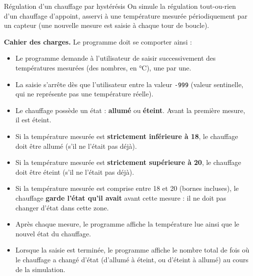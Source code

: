 \begin{UPSTIexercice}{Régulation d'un chauffage par hystérésis}
    On simule la régulation tout-ou-rien d'un chauffage d'appoint, asservi à une température mesurée périodiquement par un capteur (une nouvelle mesure est saisie à chaque tour de boucle).

    \textbf{Cahier des charges.} Le programme doit se comporter ainsi :
    \begin{itemize}
        \item Le programme demande à l'utilisateur de saisir successivement des températures mesurées (des nombres, en °C), une par une.
        \item La saisie s'arrête dès que l'utilisateur entre la valeur \texttt{-999} (valeur sentinelle, qui ne représente pas une température réelle).
        \item Le chauffage possède un état : \textbf{allumé} ou \textbf{éteint}. Avant la première mesure, il est éteint.
        \item Si la température mesurée est \textbf{strictement inférieure à 18}, le chauffage doit être allumé (s'il ne l'était pas déjà).
        \item Si la température mesurée est \textbf{strictement supérieure à 20}, le chauffage doit être éteint (s'il ne l'était pas déjà).
        \item Si la température mesurée est comprise entre 18 et 20 (bornes incluses), le chauffage \textbf{garde l'état qu'il avait} avant cette mesure : il ne doit pas changer d'état dans cette zone.
        \item Après chaque mesure, le programme affiche la température lue ainsi que le nouvel état du chauffage.
        \item Lorsque la saisie est terminée, le programme affiche le nombre total de fois où le chauffage a changé d'état (d'allumé à éteint, ou d'éteint à allumé) au cours de la simulation.
    \end{itemize}

\end{UPSTIexercice}

